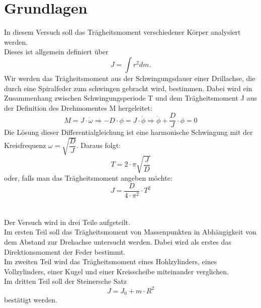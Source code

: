 \documentclass[12pt,a4paper]{article}
\begin{document}
\section{Grundlagen}
In diesem Versuch soll das Trägheitsmoment verschiedener Körper analysiert werden.\\
Dieses ist allgemein definiert über
\begin{equation}
J = \int r^2 dm.
\end{equation}
Wir werden das Trägheitsmoment aus der Schwingungsdauer einer Drillachse, die durch eine Spiralfeder zum schwingen gebracht wird, bestimmen. Dabei wird ein Zusammenhang zwischen Schwingungsperiode T und dem Trägheitsmoment J  aus der Definition des Drehmomentes M hergeleitet:
\begin{equation}
M = J\cdot \dot{\omega}\Rightarrow -D\cdot \phi = J\cdot \ddot{\phi}\Rightarrow \ddot{\phi} + \dfrac{D}{J}\cdot \phi = 0
\end{equation}
Die Lösung dieser Differentialgleichung ist eine harmonische Schwingung mit der Kreisfrequenz $\omega = \sqrt{\dfrac{D}{J}}$. Daraus folgt:
\begin{equation}
 T = 2\cdot \pi \sqrt{\dfrac{J}{D}}
\end{equation}
oder, falls man das Trägheitsmoment angeben möchte:
\begin{equation}
J = \dfrac{D}{4\cdot \pi^2}\cdot T^2
\label{eq:Trägheitsmoment}
\end{equation}\\
\\
Der Versuch wird in drei Teile aufgeteilt.\\
Im ersten Teil soll das Trägheitsmoment von Massenpunkten in Abhängigkeit von dem Abstand zur Drehachse untersucht werden. Dabei wird als erstes das Direktionsmoment der Feder bestimmt.\\
Im zweiten Teil wird das Trägheitsmoment eines Hohlzylinders, eines Vollzylinders, einer Kugel und einer Kreisscheibe miteinander verglichen.\\
Im dritten Teil soll der Steinersche Satz
\begin{equation}
J = J_0+m \cdot R^2
\end{equation}
bestätigt werden.
\end{document}
